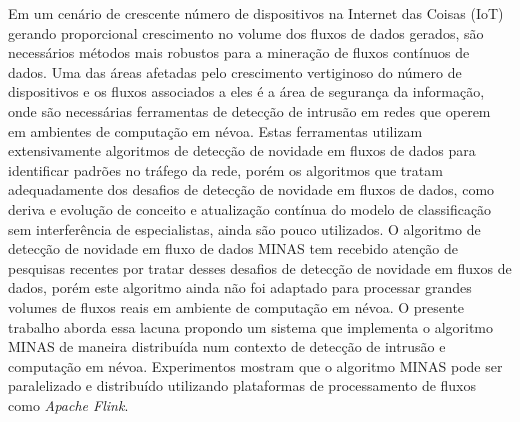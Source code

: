 \begin{resumo}

    Em um cenário de crescente número de dispositivos na Internet das Coisas
    (IoT) gerando proporcional crescimento no volume dos fluxos de dados
    gerados, são necessários métodos mais robustos para a mineração de fluxos
    contínuos de dados.
    Uma das áreas afetadas pelo crescimento vertiginoso do número de
    dispositivos e os fluxos associados a eles é a área de segurança da
    informação, onde são necessárias ferramentas de detecção de intrusão em
    redes que operem em ambientes de computação em névoa.
    Estas ferramentas utilizam extensivamente algoritmos de detecção de novidade
    em fluxos de dados para identificar padrões no tráfego da rede, porém
    os algoritmos que tratam adequadamente dos desafios de detecção de novidade
    em fluxos de dados, como deriva
    e evolução de conceito e atualização contínua do modelo de classificação sem
    interferência de especialistas, ainda são pouco utilizados.
    O algoritmo de detecção de novidade em fluxo de dados MINAS tem recebido
    atenção de pesquisas recentes por tratar desses desafios de detecção de novidade
    em fluxos de dados, porém este
    algoritmo ainda não foi adaptado para processar grandes volumes de fluxos
    reais em ambiente de computação em névoa.
    O presente trabalho aborda essa lacuna propondo um sistema
    que implementa o algoritmo MINAS de maneira distribuída num contexto
    de detecção de intrusão e computação em névoa.
    Experimentos mostram que o algoritmo MINAS pode ser paralelizado e
    distribuído utilizando plataformas de processamento de fluxos como
    \emph{Apache Flink}.


\end{resumo}

